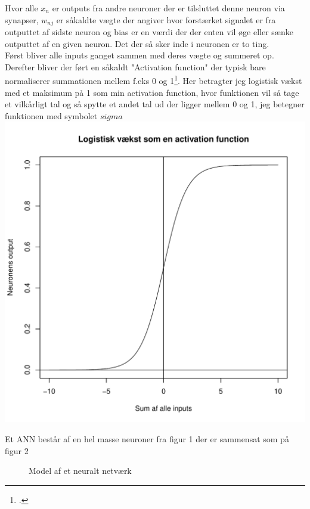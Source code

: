 Hvor alle $x_n$ er outputs fra andre neuroner der er tilsluttet denne neuron via synapser, $w_{nj}$ er såkaldte vægte der angiver hvor
forstærket signalet er fra outputtet af sidste neuron og bias er en værdi der der enten vil øge eller
sænke outputtet af en given neuron. Det der så sker inde i neuronen er to ting. \\
Først bliver alle inputs ganget sammen med deres vægte og summeret op. \\
Derefter bliver der ført en såkaldt "Activation function" der typisk bare normaliserer
summationen mellem f.eks 0 og 1\footcite{ANN11}. Her betragter jeg logistisk vækst med et maksimum på 1 som min activation function, hvor
funktionen vil så tage et vilkårligt tal og så spytte et andet tal ud der ligger mellem 0 og 1, jeg betegner funktionen med symbolet $sigma$\\
\includegraphics[width=\textwidth]{diagrammer/sigmoid.pdf}

Et ANN består af en hel masse neuroner fra figur 1 der er sammensat som på figur 2

\begin{figure}
\label{netvaerk}
\caption{Model af et neuralt netværk}

\end{figure}

